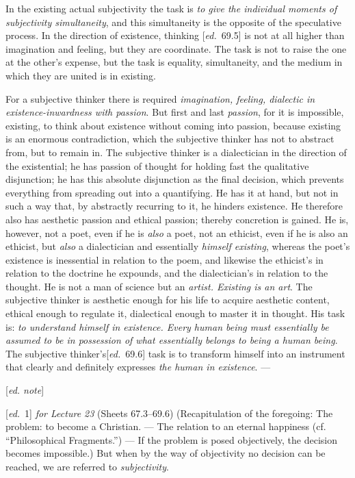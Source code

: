 \documentclass[12pt,a4paper,openany]{book}
\newcommand{\kpage}[1]{\marginnote{\footnotesize\textit{[#1]}}}
\newcommand{\ed}[1]{{\small[\textit{ed.}\ #1]}}
\newcommand{\ednote}[1]{{\small[\textit{ed. note}]}}
\begin{document}
In the existing actual subjectivity the task is \emph{to give
the individual moments of subjectivity simultaneity}, and this simultaneity is
the opposite of the speculative process. In the direction of existence,
\kpage{124}thinking \ed{69.5} is not at all higher than imagination and feeling, but they
are coordinate. The task is not to raise the one at the other's
expense, but the task is equality, simultaneity, and the
medium in which they are united is in existing.

For a subjective thinker there is required \emph{imagination, feeling, dialectic in existence-inwardness
with passion}. But first and last \emph{passion}, for it is
impossible, existing, to think about existence without coming into passion,
because existing is an enormous contradiction, which the
subjective thinker has not to abstract from, but to remain in.
The subjective thinker is a dialectician in the direction of the existential;
he has passion of thought for holding fast the qualitative disjunction;
he has this absolute disjunction as the final
decision, which prevents everything from spreading out into a quantifying.
He has it at hand, but not in such a way that, by abstractly
recurring to it, he hinders existence. He therefore also has
aesthetic passion and ethical passion; thereby concretion
is gained. He is, however, not a poet, even if he is \emph{also} a poet,
not an ethicist, even if he is also an ethicist, but \emph{also} a dialectician and
essentially \emph{himself existing}, whereas the poet's existence is inessential
in relation to the poem, and likewise the ethicist's in relation to the doctrine
he expounds, and the dialectician's in relation to the thought. He is not
a man of science but an \emph{artist. Existing is an art}. The subjective
thinker is aesthetic enough for his life to acquire aesthetic content,
ethical enough to regulate it, dialectical enough to master it
in thought. His task is: \emph{to understand himself in existence. Every human being
must essentially be assumed to be in possession of what essentially belongs to
being a human being}. The subjective thinker's\ed{69.6} task is to transform
himself into an instrument that clearly and definitely expresses
\emph{the human in existence}. ---

\ednote{}

\ed{1} \emph{for Lecture 23} (Sheets 67.3--69.6) (Recapitulation of the foregoing:
The problem: to become a Christian. --- The relation to an eternal happiness
(cf. ``Philosophical Fragments.'') --- If the problem is posed objectively, the
decision becomes impossible.) But when by the way of objectivity no
decision can be reached, we are referred to \emph{subjectivity}.
\end{document}
